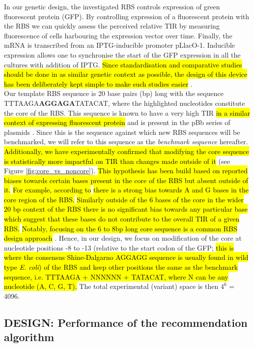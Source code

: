 \documentclass{article}
\begin{document}
In our genetic design, the investigated RBS controls expression of green fluorescent protein (GFP).
By controlling expression of a fluorescent protein with the RBS we can quickly assess the perceived relative TIR by measuring fluorescence of cells harbouring the expression vector over time.
Finally, the mRNA is transcribed from an IPTG-inducible promoter pLlacO-1.
Inducible expression allows one to synchronise the start of the GFP expression in all the cultures with addition of IPTG.
\hl{Since standardisation and comparative studies should be done in as similar genetic context as possible, the design of this device has been deliberately kept simple to make such studies easier} \cite{Beal2021}.\\

Our template RBS sequence is 20 base pairs (bp) long with the sequence TTTAAGA\textbf{AGGAGA}TATACAT, where the highlighted nucleotides constitute the core of the RBS.
This sequence is known to have a very high TIR \hl{in a similar context of expressing fluorescent protein} and is present in the pBb series of plasmids \cite{Lee2011}.
Since this is the sequence against which new RBS sequences will be benchmarked,
we will refer to this sequence as the \textit{benchmark sequence} hereafter.
\hl{Additionally, we have experimentally confirmed that modifying the core sequence is statistically more impactful on TIR than changes made outside of it }(see Figure \ref{fig:core_vs_noncore}).
\hl{This hypothesis has been build based on reported biases towards certain bases present in the core of the RBS but absent outside of it.}
\hl{For example, according to} \cite{SHULTZABERGER2001} \hl{there is a strong bias towards A and G bases in the core region of the RBS.}
\hl{Similarly outside of the 6 bases of the core in the wider 20 bp context of the RBS there is no significant bias towards any particular base which suggest that these bases do not contribute to the overall TIR of a given RBS.}
\hl{Notably, focusing on the 6 to 8bp long core sequence is a common RBS design approach} \cite{Jeschek2016}.
Hence, in our design, we focus on modification of the core at nucleotide positions -8 to -13 (relative to the start codon of the GFP; \hl{ this is where the consensus Shine-Dalgarno AGGAGG sequence is usually found in wild type \textit{E. coli}) of the RBS and keep other positions the same as the benchmark sequence, i.e. TTTAAGA + NNNNNN + TATACAT, where N can be any nucleotide (A, C, G, T).}
The total experimental (variant) space is then $4^6$ = 4096.

\subsection{DESIGN: Performance of the recommendation algorithm}
\label{sec:ucb-results}
\end{document}
